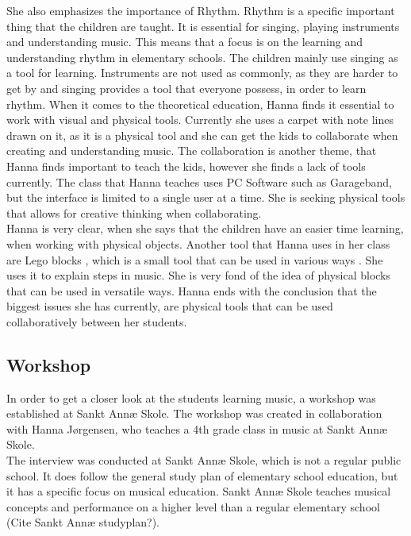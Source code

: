 She also emphasizes the importance of Rhythm. Rhythm is a specific important thing that the children are taught. It is essential for singing, playing instruments and understanding music. This means that a focus is on the learning and understanding rhythm in elementary schools. The children mainly use singing as a tool for learning. Instruments are not used as commonly, as they are harder to get by and singing provides a tool that everyone possess, in order to learn rhythm. When it comes to the theoretical education, Hanna finds it essential to work with visual and physical tools. Currently  she uses a carpet with note lines drawn on it, as it is a physical tool and she can get the kids to collaborate when creating and understanding music. The collaboration is another theme, that Hanna finds important to teach the kids, however she finds a lack of tools currently. The class that Hanna teaches uses PC Software such as Garageband, but the interface is limited to a single user at a time. She is seeking physical tools that allows for creative thinking when collaborating. \\

Hanna is very clear, when she says that the children have an easier time learning, when working with physical objects. Another tool that Hanna uses in her class are Lego blocks , which is a small tool that can be used in various ways . She uses it to explain steps in music. She is very fond of the idea of physical blocks that can be used in versatile ways.
Hanna ends with the conclusion that the biggest issues she has currently, are physical tools that can be used collaboratively between her students.\\


\subsection{Workshop}\label{sec:workshop}
In order to get a closer look at the students learning music, a workshop was established at Sankt Annæ Skole. The workshop was created in collaboration with Hanna Jørgensen, who teaches a 4th grade class in music at Sankt Annæ Skole.\\

The interview was conducted at Sankt Annæ Skole, which is not a regular public school. It does follow the general study plan of elementary school education, but it has a specific focus on musical education. Sankt Annæ Skole teaches musical concepts and performance on a higher level than a regular elementary school (Cite Sankt Annæ studyplan?). \\

